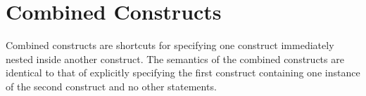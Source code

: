 %
%
%
%
%
%
%
%
%
%
%
%
%


\section{Combined Constructs}
\label{sec:Combined Constructs}
Combined constructs are shortcuts for specifying one construct immediately nested
inside another construct. The semantics of the combined constructs are identical to that
of explicitly specifying the first construct containing one instance of the second
construct and no other statements.

